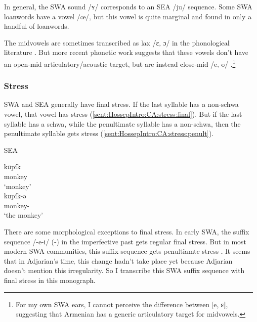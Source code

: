 In general, the SWA sound /ʏ/ corresponds to an SEA /ju/ sequence. Some SWA loanwords have a vowel /œ/, but this vowel is quite marginal and found in only a handful of loanwords. 

The midvowels are sometimes transcribed as lax /ɛ, ɔ/ in the phonological literature \citep{Vaux-1998-ArmenianPhono}. But more recent phonetic work suggests that these vowels don't have an open-mid articulatory/acoustic target, but are instead close-mid /e, o/ \citep{Toparlak-2019-MAArmenianPhonetics,Seyfarth-JIPAArmenian}.\footnote{For my own SWA ears, I cannot perceive the difference between [e, ɛ], suggesting that Armenian has a generic articulatory target for midvowels.}
	
\subsubsection{Stress}\label{sec:HossepIntro:phonotransc:modern:stress}




SWA and SEA generally have final stress. If the last syllable has a non-schwa vowel, that vowel has stress (\ref{sent:HossepIntro:CA:stress:final}). But if the last syllable has a schwa, while the penultimate syllable has a non-schwa, then the penultimate syllable gets stress (\ref{sent:HossepIntro:CA:stress:penult}). 

\begin{exe}
	\ex SEA \label{sent:HossepIntro:CA:stress}
	\begin{xlist}
		\ex \gll kɑp\'ik \\
		monkey \\
		\trans `monkey' \label{sent:HossepIntro:CA:stress:final}\\
		\ex \gll kɑp\'ik-ə \\
		monkey-{} \\
		\trans `the monkey' \label{sent:HossepIntro:CA:stress:penult} \\
		
	\end{xlist}
\end{exe}

There are some morphological exceptions to final stress. In early SWA, the suffix sequence /-e-i/ ({\thgloss}-{\pst}) in the imperfective past gets regular final stress. But in  most modern SWA communities, this suffix sequence gets penultiamte stress \citep{Dolatian-prep-ArmenianThemeAllomorphyOutputProsodyPeriphrasis}. It seems that in Adjarian's time, this change hadn't take place yet because Adjarian doesn't mention this irregularity. So I transcribe this SWA suffix sequence with final stress in this monograph. 

